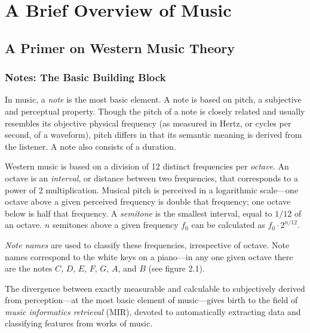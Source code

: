 \chapter{A Brief Overview of Music}

\section{A Primer on Western Music Theory}

\subsection{Notes: The Basic Building Block}

In music, a \textit{note} is the most basic element. A note is based on pitch, a subjective and perceptual property. Though the pitch of a note is closely related and usually resembles its objective physical frequency (as measured in Hertz, or cycles per second, of a waveform), pitch differs in that its semantic meaning is derived from the listener. A note also consists of a duration.

Western music is based on a division of 12 distinct frequencies per \textit{octave}. An octave is an \textit{interval}, or distance between two frequencies, that corresponds to a power of 2 multiplication. Musical pitch is perceived in a logarithmic scale---one octave above a given perceived frequency is double that frequency; one octave below is half that frequency. A \textit{semitone} is the smallest interval, equal to $1/12$ of an octave. $n$ semitones above a given frequency $f_0$ can be calculated as $f_0 \cdot 2^{n/12}$.

\textit{Note names} are used to classify these frequencies, irrespective of octave. Note names correspond to the white keys on a piano---in any one given octave there are the notes $C$, $D$, $E$, $F$, $G$, $A$, and $B$ (see figure 2.1).

The divergence between exactly measurable and calculable to subjectively derived from perception---at the most basic element of music---gives birth to the field of \textit{music informatics retrieval} (MIR), devoted to automatically extracting data and classifying features from works of music.